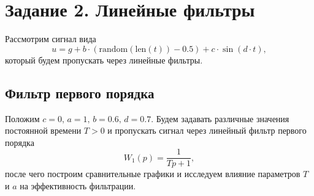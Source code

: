 \documentclass[a4paper, 12pt]{article}
\begin{document}
    \section{Задание 2. Линейные фильтры}
    Рассмотрим сигнал вида $$u=g+b\cdot(\text{random}(\text{len}(t))-0.5) + c\cdot \sin(d\cdot t),$$ который будем пропускать
    через линейные фильтры.


    \subsection{Фильтр первого порядка}
    Положим $c=0,\,a=1,\,b=0.6,\,d=0.7$. Будем задавать различные значения постоянной времени $T>0$ и пропускать сигнал через линейный
    фильтр первого порядка $$W_1(p)=\dfrac{1}{Tp+1},$$ после чего построим сравнительные графики и исследуем влияние параметров $T$ и $a$
    на эффективность фильтрации.
\end{document}
